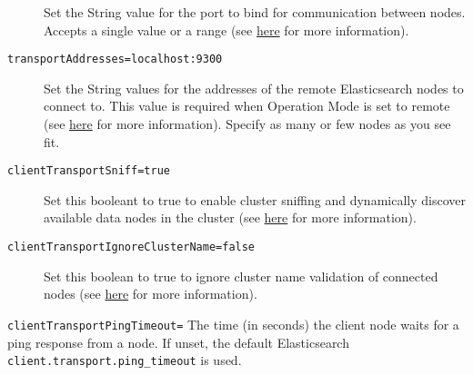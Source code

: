 \begin{description}
Set the String value for the port to bind for communication between
nodes. Accepts a single value or a range (see
\href{https://www.elastic.co/guide/en/elasticsearch/reference/6.5/modules-transport.html\#_tcp_transport}{here}
for more information).
\item[\texttt{transportAddresses=localhost:9300}]
Set the String values for the addresses of the remote Elasticsearch
nodes to connect to. This value is required when Operation Mode is set
to remote (see
\href{https://www.elastic.co/guide/en/elasticsearch/client/java-api/6.5/transport-client.html}{here}
for more information). Specify as many or few nodes as you see fit.
\item[\texttt{clientTransportSniff=true}]
Set this booleant to true to enable cluster sniffing and dynamically
discover available data nodes in the cluster (see
\href{https://www.elastic.co/guide/en/elasticsearch/client/java-api/6.5/transport-client.html}{here}
for more information).
\item[\texttt{clientTransportIgnoreClusterName=false}]
Set this boolean to true to ignore cluster name validation of connected
nodes (see
\href{https://www.elastic.co/guide/en/elasticsearch/client/java-api/6.5/transport-client.html}{here}
for more information).
\end{description}

\texttt{clientTransportPingTimeout=} The time (in seconds) the client
node waits for a ping response from a node. If unset, the default
Elasticsearch \texttt{client.transport.ping\_timeout} is used.

